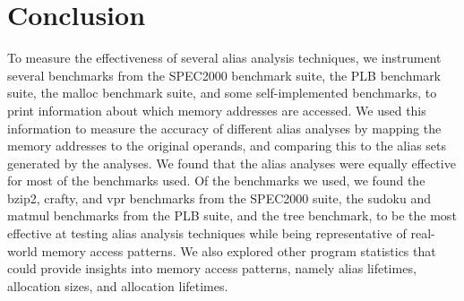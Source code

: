 \chapter{Conclusion}

To measure the effectiveness of several alias analysis techniques, we instrument several benchmarks from the SPEC2000 benchmark suite, the PLB benchmark suite, the malloc benchmark suite, and some self-implemented benchmarks, to print information about which memory addresses are accessed. We used this information to measure the accuracy of different alias analyses by mapping the memory addresses to the original operands, and comparing this to the alias sets generated by the analyses. We found that the alias analyses were equally effective for most of the benchmarks used. Of the benchmarks we used, we found the bzip2, crafty, and vpr benchmarks from the SPEC2000 suite, the sudoku and matmul benchmarks from the PLB suite, and the tree benchmark, to be the most effective at testing alias analysis techniques while being representative of real-world memory access patterns. We also explored other program statistics that could provide insights into memory access patterns, namely alias lifetimes, allocation sizes, and allocation lifetimes.
